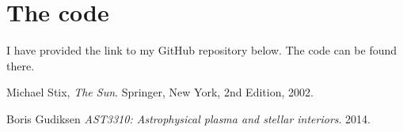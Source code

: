\documentclass[a4paper, 11pt, english]{article}
\begin{document}
\section{The code}
I have provided the link to my GitHub repository below. The code can be found there.

%
\url{}

\begin{thebibliography}{9}
		Michael Stix,
		\emph{The Sun}.
		Springer, New York,
		2nd Edition,
		2002.

		Boris Gudiksen
		\emph{AST3310: Astrophysical plasma and stellar interiors}.
		2014.

\end{thebibliography}
\end{document}
